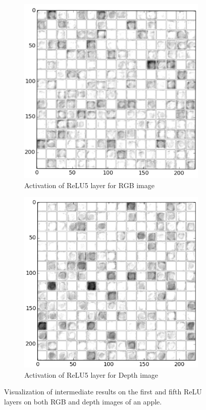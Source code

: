 \begin{figure}
	\begin{subfigure}[b]{0.45\linewidth}
		\includegraphics[width=\textwidth]{img/relu5_rgb.png}
		\caption{Activation of ReLU5 layer for RGB image}
	\end{subfigure}   	
	\begin{subfigure}[b]{0.45\linewidth}
		\includegraphics[width=\textwidth]{img/relu5_dep.png}
		\caption{Activation of ReLU5 layer for Depth image}
	\end{subfigure}
	\caption{Visualization of intermediate results on the first and fifth ReLU layers on both RGB and depth images of an apple.}
	\label{fig:intermediate_result}
\end{figure}

